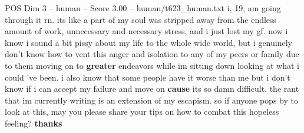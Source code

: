\begin{textsample}{POS Dim 3 – human – Score 3.00 – human/t623\_human.txt}  \label{ex:f3_pos_015}
i, 19, am going through it rn. its like a part of my soul was stripped away from the endless amount of work, unnecessary and necessary stress, and i just lost my gf. now i know i sound a bit pissy about my life to the whole wide world, but i genuinely don't know how to vent this anger and isolation to any of my peers or family due to them moving on to \textbf{greater} endeavors while im sitting down looking at what i could 've been. i also know that some people have it worse than me but i don't know if i can accept my failure and move on \textbf{cause} its so damn difficult. the rant that im currently writing is an extension of my escapism. so if anyone pops by to look at this, may you please share your tips on how to combat this hopeless feeling? \textbf{thanks}

\end{textsample}
